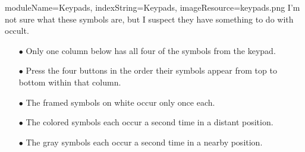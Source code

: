 \documentclass{../../ktane-mod}
\begin{document}
\begin{module}{
  moduleName=Keypads,
  indexString=Keypads,
  imageResource=keypads.png
}
{
  I'm not sure what these symbols are, but I suspect they have something to do with occult.
}

\begin{itemize}
  \item[$\bullet$] Only one column below has all four of the symbols from the keypad.
  \item[$\bullet$] Press the four buttons in the order their symbols appear from top to bottom within that column.
  \item[$\bullet$] The framed symbols on white occur only once each.
  \item[$\bullet$] The colored symbols each occur a second time in a distant position.
  \item[$\bullet$] The gray symbols each occur a second time in a nearby position.
\end{itemize}

\vspace{1cm}


\end{module}
\end{document}
